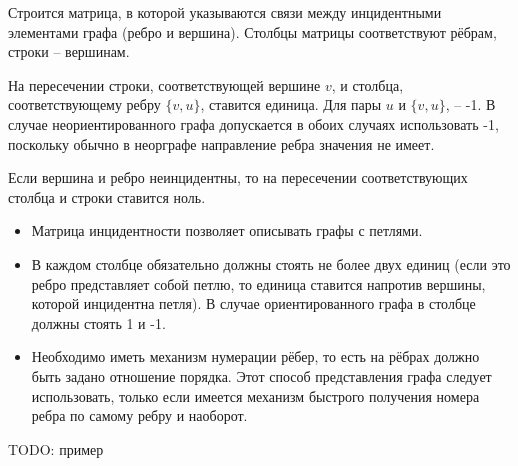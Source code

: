 Строится матрица, в которой указываются связи между инцидентными элементами графа (ребро и вершина). Столбцы матрицы соответствуют рёбрам, строки -- вершинам.

На пересечении строки, соответствующей вершине $v$, и столбца, соответствующему ребру $\{v, u\}$, ставится единица. Для пары $u$ и $\{v, u\}$, -- -1.
В случае неориентированного графа допускается в обоих случаях использовать -1, поскольку обычно в неорграфе направление ребра значения не имеет.

Если вершина и ребро неинцидентны, то на пересечении соответствующих столбца и строки ставится ноль.

\begin{remark}
	\begin{itemize}
		\item Матрица инцидентности позволяет описывать графы с петлями.
		\item В каждом столбце обязательно должны стоять не более двух единиц (если это ребро представляет собой петлю, то единица ставится напротив вершины, которой инцидентна петля). В случае ориентированного графа в столбце должны стоять 1 и -1.
		\item Необходимо иметь механизм нумерации рёбер, то есть на рёбрах должно быть задано отношение порядка. Этот способ представления графа следует использовать, только если имеется механизм быстрого получения номера ребра по самому ребру и наоборот.
	\end{itemize}
\end{remark}

TODO: пример